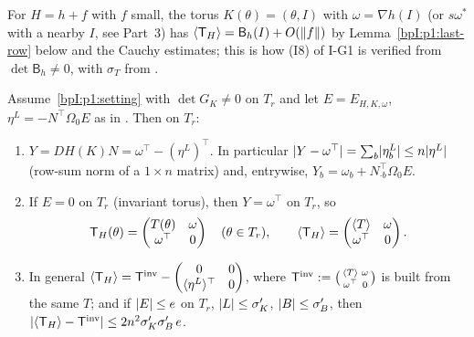 \begin{remark}[Use]\label{bpI:p1:trivial-use}
For $H=h+f$ with $f$ small, the torus $K(\theta)=(\theta,I)$ with $\omega=\nabla h(I)$ (or $s\omega^*$ with a
nearby $I$, see Part~3) has $\langle \mathsf T_H\rangle=\mathsf B_h(I)+O(\lVert f\rVert)$ by Lemma~\ref{bpI:p1:last-row}
below and the Cauchy estimates; this is how (I8) of I-G1 is verified from $\det\mathsf B_h\ne0$, with
$\sigma_T$ from .
\end{remark}

\begin{lemma}\label{bpI:p1:last-row}
Assume~\ref{bpI:p1:setting} with $\det G_K\ne0$ on $T_r$ and let $E=E_{H,K,\omega}$, $\eta^L=-N^\top\Omega_0E$ as in
. Then on $T_r$:
\begin{enumerate}[label=(\alph*)]
\item $Y=DH(K)N=\omega^\top-(\eta^L)^\top$. In particular $\lvert Y-\omega^\top\rvert=\sum_b\lvert \eta^L_b\rvert\le n\lvert \eta^L\rvert$ (row-sum norm of a $1\times n$ matrix) and, entrywise,
  $Y_b=\omega_b+N_{\cdot b}^\top\Omega_0E$.
\item If $E=0$ on $T_r$ (invariant torus), then $Y=\omega^\top$ on $T_r$, so
  \[
  \mathsf T_H(\theta)=\begin{pmatrix}T(\theta)&\omega\\ \omega^\top&0\end{pmatrix}\quad(\theta\in T_r),\qquad
  \langle \mathsf T_H\rangle=\begin{pmatrix}\langle T\rangle&\omega\\ \omega^\top&0\end{pmatrix}.
  \]
\item In general $\langle \mathsf T_H\rangle=\mathsf T^{\mathrm{inv}}-\begin{pmatrix}0&0\\ \langle \eta^L\rangle^\top&0\end{pmatrix}$, where
  $\mathsf T^{\mathrm{inv}}:=\bigl(\begin{smallmatrix}\langle T\rangle&\omega\\ \omega^\top&0\end{smallmatrix}\bigr)$ is built from the same $T$; and if
  $\lvert E\rvert\le e$ on $T_r$, $\lvert L\rvert\le\sigma_K'$, $\lvert B\rvert\le\sigma_B'$, then
  $\lvert \langle \mathsf T_H\rangle-\mathsf T^{\mathrm{inv}}\rvert\le2n^2\sigma_K'\sigma_B'\,e$.
\end{enumerate}
\end{lemma}

